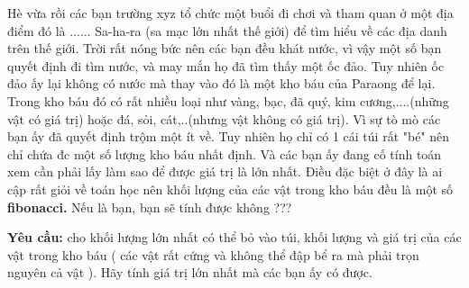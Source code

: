 Hè vừa rồi các bạn trường xyz tổ chức một buổi đi chơi và tham quan ở một địa điểm đó là ...... Sa-ha-ra (sa mạc lớn nhất thế giới) để tìm hiểu về các địa danh trên thế giới. Trời rất nóng bức nên các bạn đều khát nước, vì vậy một số bạn quyết định đi tìm nước, và may mắn họ đã tìm thấy một ốc đảo. Tuy nhiên ốc đảo ấy lại không có nước mà thay vào đó là một kho báu của Paraong để lại. Trong kho báu đó có rất nhiều loại như vàng, bạc, đã quý, kim cương,....(những vật có giá trị) hoặc đá, sỏi, cát,..(nhưng vật không có giá trị). Vì sự tò mò các bạn ấy đã quyết định trộm một ít về. Tuy nhiên họ chỉ có 1 cái túi rất "bé" nên chỉ chứa đc một số lượng kho báu nhất định. Và các bạn ấy đang cố tính toán xem cần phải lấy làm sao để được giá trị là lớn nhất. Điều đặc biệt ở đây là ai cập rất giỏi về toán học nên khối lượng của các vật trong kho báu đều là một số \textbf{ fibonacci. } Nếu là bạn, bạn sẽ tính được không ???

\textbf{Yêu cầu: } cho khối lượng lớn nhất có thể bỏ vào túi, khối lượng và giá trị của các vật trong kho báu ( các vật rất cứng và không thể đập bể ra mà phải trọn nguyên cả vật ). Hãy tính giá trị lớn nhất mà các bạn ấy có được.

\
